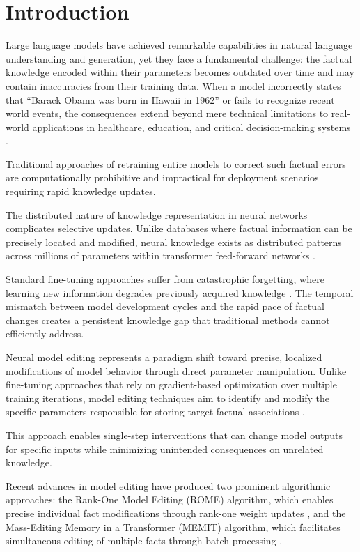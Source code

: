 \chapter{Introduction}

Large language models have achieved remarkable capabilities in natural language understanding and generation, yet they face a fundamental challenge: the factual knowledge encoded within their parameters becomes outdated over time and may contain inaccuracies from their training data. When a model incorrectly states that ``Barack Obama was born in Hawaii in 1962'' or fails to recognize recent world events, the consequences extend beyond mere technical limitations to real-world applications in healthcare, education, and critical decision-making systems \cite{brown_2020_language}. 

Traditional approaches of retraining entire models to correct such factual errors are computationally prohibitive and impractical for deployment scenarios requiring rapid knowledge updates.

The distributed nature of knowledge representation in neural networks complicates selective updates. Unlike databases where factual information can be precisely located and modified, neural knowledge exists as distributed patterns across millions of parameters within transformer feed-forward networks \cite{geva_2021_transformer, meng_2022_locating}. 

Standard fine-tuning approaches suffer from catastrophic forgetting, where learning new information degrades previously acquired knowledge \cite{mccloskey_1989_catastrophic}. The temporal mismatch between model development cycles and the rapid pace of factual changes creates a persistent knowledge gap that traditional methods cannot efficiently address.

Neural model editing represents a paradigm shift toward precise, localized modifications of model behavior through direct parameter manipulation. Unlike fine-tuning approaches that rely on gradient-based optimization over multiple training iterations, model editing techniques aim to identify and modify the specific parameters responsible for storing target factual associations \cite{mitchell_2022_mend}. 

This approach enables single-step interventions that can change model outputs for specific inputs while minimizing unintended consequences on unrelated knowledge.

Recent advances in model editing have produced two prominent algorithmic approaches: the Rank-One Model Editing (ROME) algorithm, which enables precise individual fact modifications through rank-one weight updates \cite{mitchell_2022_rome}, and the Mass-Editing Memory in a Transformer (MEMIT) algorithm, which facilitates simultaneous editing of multiple facts through batch processing \cite{meng_2022_memit}. 

